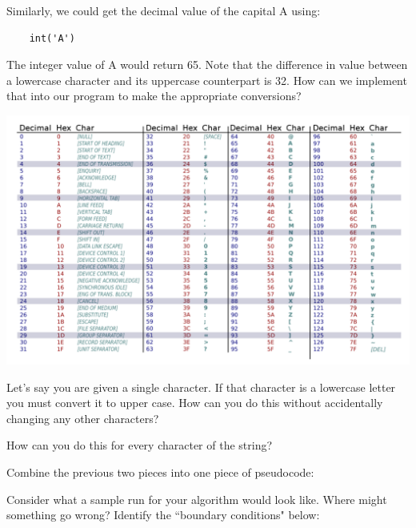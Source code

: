 Similarly, we could get the decimal value of the capital A using:
\begin{verbatim}
    int('A')
\end{verbatim}
The integer value of A would return 65. Note that the difference in value between a lowercase character and its uppercase counterpart is 32. How can we implement that into our program to make the appropriate conversions?


\includegraphics[width=\textwidth]{images/ascii_table.png}

\begin{multipart}
Let's say you are given a single character. If that character is a lowercase letter you must convert it to upper case. How can you do this without accidentally changing any other characters?
\end{multipart}

\vspace{1.5cm}

\begin{multipart}
How can you do this for every character of the string?
\end{multipart}

\vspace{1.5cm}

\begin{multipart}
Combine the previous two pieces into one piece of pseudocode:
\end{multipart}

\vspace{3cm}

\begin{multipart}
Consider what a sample run for your algorithm would look like. Where might something go wrong? Identify the ``boundary conditions" below:
\end{multipart}



